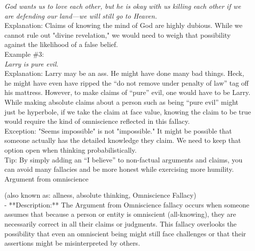 \documentclass[a4paper,12pt,single,pdftex]{scrartcl}
\begin{document}
    
      {\em God wants us to love each other, but he is okay with us killing each other if we are defending our land—we will still go to Heaven.}
    \\

    
      Explanation: Claims of knowing the mind of God are highly dubious. While we cannot rule out "divine revelation," we would need to weigh that possibility against the likelihood of a false belief.
    \\

    
      Example \#3: 
    \\

    
      {\em Larry is pure evil.}
    \\

    
      Explanation: Larry may be an ass. He might have done many bad things. Heck, he might have even have ripped the “do not remove under penalty of law” tag off his mattress. However, to make claims of “pure” evil, one would have to be Larry. While making absolute claims about a person such as being “pure evil” might just be hyperbole, if we take the claim at face value, knowing the claim to be true would require the kind of omniscience reflected in this fallacy.
    \\

    
      Exception: "Seems impossible" is not "impossible." It might be possible that someone actually has the detailed knowledge they claim. We need to keep that option open when thinking probabilistically.
    \\

    
      Tip: By simply adding an “I believe” to non-factual arguments and claims, you can avoid many fallacies and be more honest while exercising more humility.
    \\

  

Argument from omniscience
    
      (also known as: allness, absolute thinking, Omniscience Fallacy)
    \\

  
    
      - **Description:** The Argument from Omniscience fallacy occurs when someone assumes that because a person or entity is omniscient (all-knowing), they are necessarily correct in all their claims or judgments. This fallacy overlooks the possibility that even an omniscient being might still face challenges or that their assertions might be misinterpreted by others.
    \\
\end{document}
